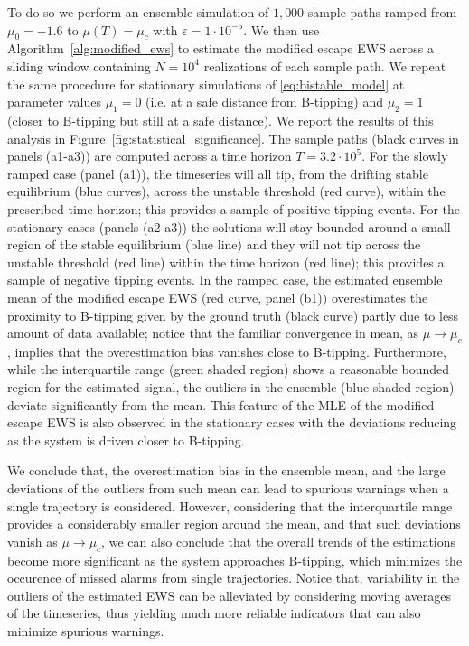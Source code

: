 \documentclass[a4paper,fleqn]{cas-sc}
\newcommand{\fref}[1]{Figure~\ref{#1}}
\begin{document}
To do so we perform an ensemble simulation of $1{,}000$ sample paths ramped from $\mu_0=-1.6$ to $\mu(T)=\mu_c$ with $\varepsilon=1\cdot10^{-5}$.
We then use Algorithm~\ref{alg:modified_ews} to estimate the modified escape EWS across a sliding window containing $N=10^4$ realizations of each sample path.
We repeat the same procedure for stationary simulations of \eqref{eq:bistable_model} at parameter values $\mu_1=0$ (i.e. at a safe distance from B-tipping) and $\mu_2=1$ (closer to B-tipping but still at a safe distance).
We report the results of this analysis in \fref{fig:statistical_significance}.
The sample paths (black curves in panels (a1-a3)) are computed across a time horizon $T=3.2\cdot10^5$. 
For the slowly ramped case (panel (a1)), the timeseries will all tip, from the drifting stable equilibrium (blue curves), across the unstable threshold (red curve), within the prescribed time horizon; this provides a sample of positive tipping events.
For the stationary cases (panels (a2-a3)) the solutions will stay bounded around a small region of the stable equilibrium (blue line) and they will not tip across the unstable threshold (red line) within the time horizon (red line); this provides a sample of negative tipping events.
In the ramped case, the estimated ensemble mean of the modified escape EWS (red curve, panel (b1)) overestimates the proximity to B-tipping given by the ground truth (black curve) partly due to less amount of data available; notice that the familiar convergence in mean, as $\mu\to\mu_c$, implies that the overestimation bias vanishes close to B-tipping.
Furthermore, while the interquartile range (green shaded region) shows a reasonable bounded region for the estimated signal, the outliers in the ensemble (blue shaded region) deviate significantly from the mean.
This feature of the MLE of the modified escape EWS is also observed in the stationary cases with the deviations reducing as the system is driven closer to B-tipping.

We conclude that, the overestimation bias in the ensemble mean, and the large deviations of the outliers from such mean can lead to spurious warnings when a single trajectory is considered.
However, considering that the interquartile range provides a considerably smaller region around the mean, and that such deviations vanish as $\mu\to\mu_c$, we can also conclude that the overall trends of the estimations become more significant as the system approaches B-tipping, which minimizes the occurence of missed alarms from single trajectories.
Notice that, variability in the outliers of the estimated EWS can be alleviated by considering moving averages of the timeseries, thus yielding much more reliable indicators that can also minimize spurious warnings.
\end{document}
